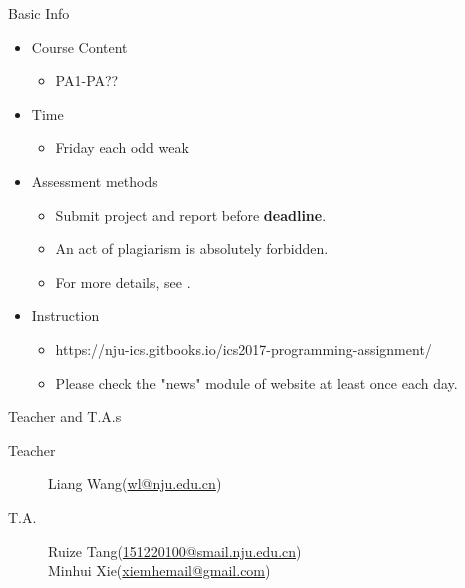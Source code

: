 \documentclass{beamer}
\title{\titletext}
\subtitle{Introduction}
\author{Xie}
\institute{xiemhemail@gmail.com}
\date{Sep 8th, 2017}
\begin{document}
	\maketitle

\begin{frame}{Basic Info}
	\begin{itemize}
		\item Course Content
		\begin{itemize}
			\item PA1-PA??
		\end{itemize}
		\item Time
		\begin{itemize}
			\item Friday each odd weak
		\end{itemize}
		\item Assessment methods
			\begin{itemize}
				\item Submit project and report before \textbf{deadline}.
				\item An act of plagiarism is absolutely forbidden.
				\item For more details, see \href{https://nju-ics.gitbooks.io/ics2017-programming-assignment/content/submit.html}{}.
			\end{itemize}
		\item \alert{Instruction}
		\begin{itemize}
			\item https://nju-ics.gitbooks.io/ics2017-programming-assignment/
			\item \alert{\huge Please check the "news" module of website at least once each day.}
		\end{itemize}
	\end{itemize}
\end{frame}

\begin{frame}{Teacher and T.A.s}
	\begin{description}
		\item[Teacher] Liang Wang(\href{mailto:wl@nju.edu.cn}{wl@nju.edu.cn})
		\item[T.A.] Ruize Tang(\href{mailto:151220100@smail.nju.edu.cn}{151220100@smail.nju.edu.cn})\\
					Minhui Xie(\href{mailto:xiemhemail@gmail.com}{xiemhemail@gmail.com})
	\end{description}
\end{frame}
\end{document}
